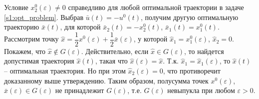\documentclass[../main.tex]{subfiles}
\begin{document}
Условие $ x_2^0(\varepsilon) \neq 0 $ справедливо для любой оптимальной траектории в задаче \eqref{s1:opt_problem}. Выбрав $ \bar{u}(t) = -u^0(t) $, получим другую оптимальную траекторию $ \bar{x}(t) $, для которой $ \bar{x}_2(t) = -x_2^0(t) $, $ \bar{x}_1(t) = x_1^0(t) $.
Рассмотрим точку $ \hat{x} = \dfrac{1}{2}x^0(\varepsilon) + \dfrac{1}{2}\bar{x}(\varepsilon) $, у которой $ \hat{x}_1 = x_1^0(\varepsilon) $, $ \hat{x}_2 = 0 $. Покажем, что $ \hat{x} \notin G(\varepsilon) $. Действительно, если $ \hat{x} \in G(\varepsilon) $, то найдется допустимая траектория $ \hat{x}(t) $, такая что $ \hat{x}(\varepsilon) = \hat{x} $. Т.к. $ \hat{x}_1 = \hat{x}_1(\varepsilon) $, то $  \hat{x}(t) $ -- оптимальная траектория. Но при этом $ \hat{x}_2(\varepsilon) = 0 $, что противоречит доказанному выше утверждению. Таким образом, полусумма точек $ x^0(\varepsilon) $, $ \bar{x}(\varepsilon) \in G(\varepsilon) $ не принадлежит $ G(\varepsilon) $, т.е. $ G(\varepsilon) $ невыпукла при любом $ \varepsilon > 0 $.




 
\end{document}
